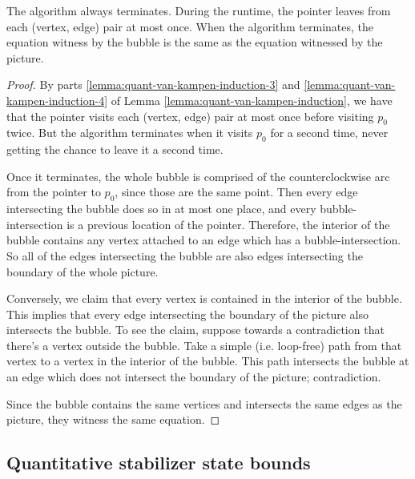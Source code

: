 \begin{lemma}
The algorithm always terminates. During the runtime, the pointer leaves from each (vertex, edge) pair at most once. When the algorithm terminates, the equation witness by the bubble is the same as the equation witnessed by the picture. 
\end{lemma}
\begin{proof}

	By parts \eqref{lemma:quant-van-kampen-induction-3} and \eqref{lemma:quant-van-kampen-induction-4} of Lemma \ref{lemma:quant-van-kampen-induction}, we have that the pointer visits each (vertex, edge) pair at most once before visiting $p_0$ twice. But the algorithm terminates when it visits $p_0$ for a second time, never getting the chance to leave it a second time. 

	Once it terminates, the whole bubble is comprised of the counterclockwise arc from the pointer to $p_0$, since those are the same point. Then every edge intersecting the bubble does so in at most one place, and every bubble-intersection is a previous location of the pointer. Therefore, the interior of the bubble contains any vertex attached to an edge which has a bubble-intersection. So all of the edges intersecting the bubble are also edges intersecting the boundary of the whole picture. 

	Conversely, we claim that every vertex is contained in the interior of the bubble. This implies that every edge intersecting the boundary of the picture also intersects the bubble.
	 To see the claim, suppose towards a contradiction that there's a vertex outside the bubble. Take a simple (i.e. loop-free) path from that vertex to a vertex in the interior of the bubble. This path intersects the bubble at an edge which does not intersect the boundary of the picture; contradiction. 

	Since the bubble contains the same vertices and intersects the same edges as the picture, they witness the same equation. 

\end{proof}


\subsection{Quantitative stabilizer state bounds}
\label{subsection:quant-stabilizer-state-bounds}


